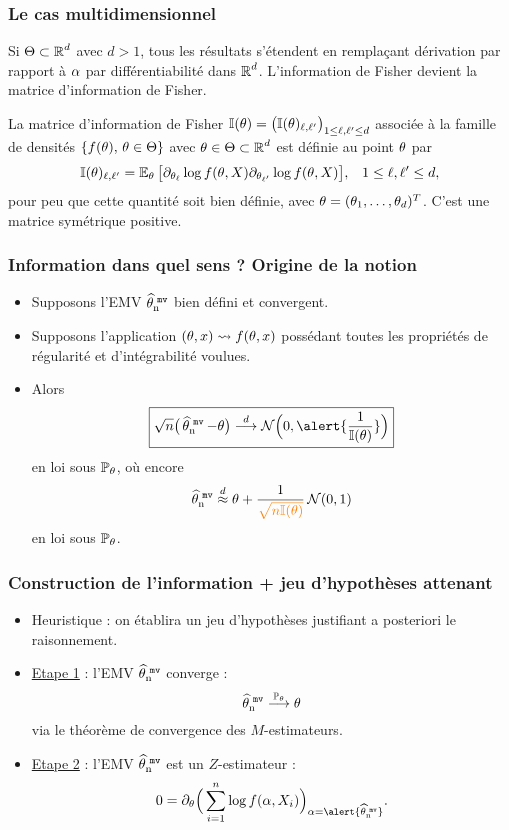 \begin{frame}
\frametitle{Le cas multidimensionnel}
Si $\Theta \subset \operatorname{{\mathbb R}}^d$ avec $ d >1$, tous les résultats s'étendent en remplaçant dérivation par rapport à $\alpha$ par différentiabilité dans $\operatorname{{\mathbb R}}^d$. L'information de Fisher devient la \alert{matrice d'information de Fisher}.
\begin{definition} La matrice d'information de Fisher $\mathbb{I}(\theta) = \big(\mathbb{I}(\theta)_{\ell,\ell'}\big)_{1 \leq \ell,\ell' \leq d}$ associée à la famille de densités $\{f(\theta),\,\theta \in \Theta\}$ avec $\theta \in \Theta \subset \operatorname{{\mathbb R}}^d$ est définie au point $\theta$ par
$$\mathbb{I}(\theta)_{\ell,\ell'} = \operatorname{{\mathbb E}}_\theta\big[\partial_{\theta_\ell}\log f(\theta, X) \partial_{\theta_{\ell'}} \log f(\theta, X)\big],\;\;\;1 \leq \ell,\ell' \leq d,$$
pour peu que cette quantité soit bien définie, avec $\theta  = (\theta_1,\ldots, \theta_d)^T$. C'est une matrice symétrique positive.
\end{definition}
\end{frame}

\begin{frame}
\frametitle{Information dans quel sens ? Origine de la notion}
\begin{itemize}
\item Supposons l'EMV $\operatorname{\widehat \theta_n^{\,\,{\tt mv}}}$ bien défini et \alert{convergent}.
\item Supposons l'application $(\theta,x) \leadsto f(\theta, x)$ possédant \alert{toutes les propriétés de régularité et d'intégrabilité} voulues.
\item Alors
$$\boxed{\sqrt{n}\big(\estMV-\truetheta\big) \stackrel{d}{\longrightarrow} {\mathcal N}\Big(0,\alert{\frac{1}{\mathbb{I}(\truetheta)}}\Big)}$$
en loi sous $\operatorname{{\mathbb P}}_\theta$, où encore
$$\estMV \stackrel{d}{\approx} \truetheta +\frac{1}{\tco{\sqrt{n\mathbb{I}(\truetheta)}}} \,{\mathcal N}(0,1)$$
en loi sous $\operatorname{{\mathbb P}}_\theta$.
\end{itemize}
\end{frame}

\begin{frame}
\frametitle{Construction de l'information + jeu d'hypothèses attenant}
\begin{itemize}
\item Heuristique : on établira un jeu d'hypothèses justifiant \alert{a posteriori} le raisonnement.
\item \underline{Etape 1} : l'EMV $\operatorname{\widehat \theta_n^{\,\,{\tt mv}}}$ \alert{converge} :
$$\operatorname{\widehat \theta_n^{\,\,{\tt mv}}} \stackrel{\operatorname{{\mathbb P}}_\theta}{\longrightarrow} \theta$$
via le théorème de convergence des $M$-estimateurs.
\item \underline{Etape 2} : l'EMV $\operatorname{\widehat \theta_n^{\,\,{\tt mv}}}$ est un \alert{$Z$-estimateur} :
$$0 = \partial_\truetheta \Big(\sum_{i = 1}^n \log f(\curtheta,X_i)\Big)_{\curtheta = \alert{\estMV}}.$$
\end{itemize}
\end{frame}

